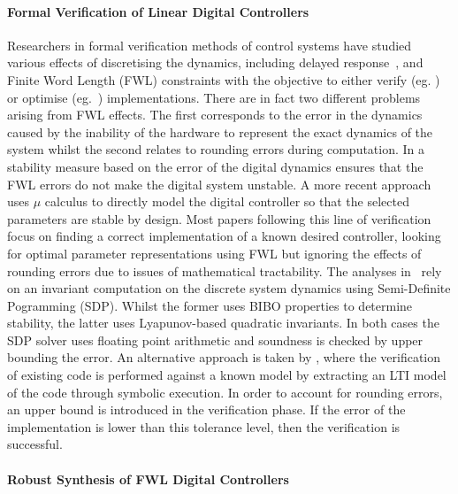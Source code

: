 \documentclass{sig-alternate-05-2015}
\begin{document}
\paragraph{Formal Verification of Linear Digital Controllers} 

Researchers in formal verification methods of control systems have studied
various effects of discretising the dynamics, including delayed
response~\cite{Duggirala2015}, and Finite Word Length (FWL) constraints with
the objective to either verify (eg.  \cite{daes20161}) or optimise
(eg.~\cite{oudjida2014design}) implementations.  There are in fact two
different problems arising from FWL effects.  The first corresponds to the
error in the dynamics caused by the inability of the hardware to represent
the exact dynamics of the system whilst the second relates to rounding
errors during computation.  In \cite{fialho1994stability} a stability
measure based on the error of the digital dynamics ensures that the FWL
errors do not make the digital system unstable.  A more recent
approach~\cite{DBLP:journals/automatica/WuLCC09} uses $\mu$ calculus to
directly model the digital controller so that the selected parameters are
stable by design.  Most papers following this line of verification focus on
finding a correct implementation of a known desired controller, looking for
optimal parameter representations using FWL but ignoring the effects of
rounding errors due to issues of mathematical tractability.  The analyses
in~\cite{DBLP:conf/hybrid/WangGRJF16,DBLP:conf/hybrid/RouxJG15} rely on an
invariant computation on the discrete system dynamics using Semi-Definite
Pogramming (SDP).  Whilst the former uses BIBO properties to determine
stability, the latter uses Lyapunov-based quadratic invariants.  In both
cases the SDP solver uses floating point arithmetic and soundness is checked
by upper bounding the error.
An alternative approach is taken by \cite{park2016scalable}, where the verification of existing
code is performed against a known model by extracting an LTI model of the
code through symbolic execution. In order to account for rounding errors, an
upper bound is introduced in the verification phase. If the error of the implementation
is lower than this tolerance level, then the verification is successful. 

\paragraph{Robust Synthesis of FWL Digital Controllers}
\end{document}
